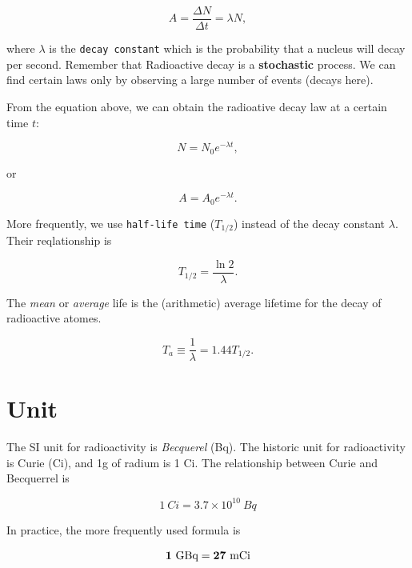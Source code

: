 \documentclass[]{book}
\theoremstyle{definition}
\theoremstyle{definition}
\theoremstyle{definition}
\theoremstyle{remark}
\begin{document}
\begin{equation}
A = \frac{\Delta N}{\Delta t} = \lambda N,
\end{equation}

where \(\lambda\) is the \texttt{decay\ constant} which is the
probability that a nucleus will decay per second. Remember that
Radioactive decay is a \textbf{stochastic} process. We can find certain
laws only by observing a large number of events (decays here).

From the equation above, we can obtain the radioative decay law at a
certain time \(t\):

\begin{equation}
N = N_0 e^{-\lambda t},
\label{eq:decay1}
\end{equation}

or

\begin{equation}
A = A_0 e^{-\lambda t}. 
\label{eq:decay2}
\end{equation}

More frequently, we use \texttt{half-life\ time} (\(T_{1/2}\)) instead
of the decay constant \(\lambda\). Their reqlationship is

\begin{equation}
  T_{1/2} = \frac{\ln 2}{\lambda}.
  \label{eq:halflife}
\end{equation}

The \emph{mean} or \emph{average} life is the (arithmetic) average
lifetime for the decay of radioactive atomes.

\begin{equation}
  T_{a} \equiv \frac{1}{\lambda} = 1.44T_{1/2}.
    \label{eq:avelife}
\end{equation}

\section{Unit}\label{decay-unit}

The SI unit for radioactivity is \emph{Becquerel} (Bq). The historic
unit for radioactivity is Curie (Ci), and 1g of radium is 1 Ci. The
relationship between Curie and Becquerrel is

\begin{equation}
 1\ Ci = 3.7 \times 10^{10} \ Bq
 \label{eq:curie2bq}
\end{equation}

In practice, the more frequently used formula is

\begin{equation}
  \bold {1\ \text{GBq} = 27\ \text{mCi}}
\end{equation}
\end{document}
